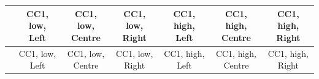 
\begin{center}
\begin{small}
\begin{longtable}{l@{} c@{} c@{} c@{} c@{} c@{} c@{}}
\hline
 & \shortstack{\rule{0pt}{2.2ex}\hspace{0.25cm}CC1, low,\hspace{0.25cm}\\Left} & \shortstack{\rule{0pt}{2.2ex}\hspace{0.25cm}CC1, low,\hspace{0.25cm}\\Centre} & \shortstack{\rule{0pt}{2.2ex}\hspace{0.25cm}CC1, low,\hspace{0.25cm}\\Right} & \shortstack{\rule{0pt}{2.2ex}\hspace{0.25cm}CC1, high,\hspace{0.25cm}\\Left} & \shortstack{\rule{0pt}{2.2ex}\hspace{0.25cm}CC1, high,\hspace{0.25cm}\\Centre} & \shortstack{\rule{0pt}{2.2ex}\hspace{0.25cm}CC1, high,\hspace{0.25cm}\\Right} \\
\hline
\endfirsthead
\hline
 & \shortstack{\rule{0pt}{2.2ex}\hspace{0.25cm}CC1, low,\hspace{0.25cm}\\Left} & \shortstack{\rule{0pt}{2.2ex}\hspace{0.25cm}CC1, low,\hspace{0.25cm}\\Centre} & \shortstack{\rule{0pt}{2.2ex}\hspace{0.25cm}CC1, low,\hspace{0.25cm}\\Right} & \shortstack{\rule{0pt}{2.2ex}\hspace{0.25cm}CC1, high,\hspace{0.25cm}\\Left} & \shortstack{\rule{0pt}{2.2ex}\hspace{0.25cm}CC1, high,\hspace{0.25cm}\\Centre} & \shortstack{\rule{0pt}{2.2ex}\hspace{0.25cm}CC1, high,\hspace{0.25cm}\\Right} \\

\end{longtable}
\end{small}
\end{center}
